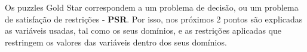 
Os puzzles Gold Star correspondem a um problema de decisão, ou um problema de satisfação de restrições - \textbf{PSR}. Por isso, nos próximos 2 pontos são explicadas as variáveis usadas, tal como os seus domínios, e as restrições aplicadas que restringem os valores das variáveis dentro dos seus domínios.

